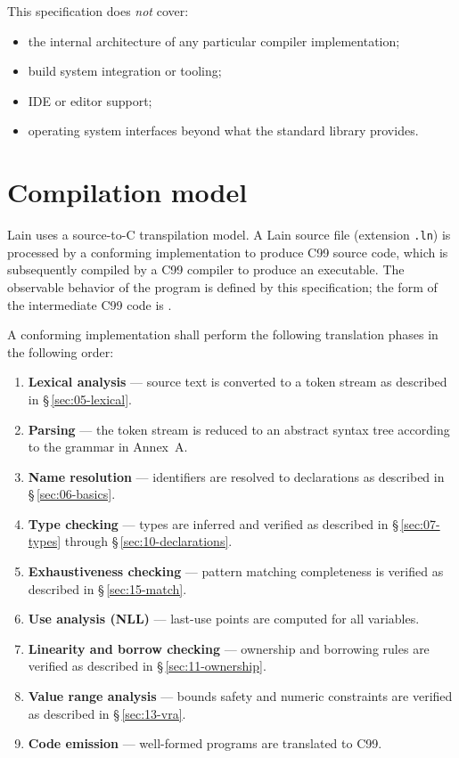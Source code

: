 \pnum
This specification does \emph{not} cover:

\begin{itemize}
  \item the internal architecture of any particular compiler implementation;
  \item build system integration or tooling;
  \item IDE or editor support;
  \item operating system interfaces beyond what the standard library provides.
\end{itemize}

\section{Compilation model}
\label{sec:scope.compilation}

\pnum
Lain uses a source-to-C transpilation model.  A Lain source file (extension
\texttt{.ln}) is processed by a conforming implementation to produce C99
source code, which is subsequently compiled by a C99 compiler to produce an
executable.  The observable behavior of the program is defined by this
specification; the form of the intermediate C99 code is
.

\pnum
A conforming implementation shall perform the following translation phases
in the following order:

\begin{enumerate}
  \item \textbf{Lexical analysis} --- source text is converted to a token
        stream as described in \S\,\ref{sec:05-lexical}.
  \item \textbf{Parsing} --- the token stream is reduced to an abstract
        syntax tree according to the grammar in Annex~A.
  \item \textbf{Name resolution} --- identifiers are resolved to
        declarations as described in \S\,\ref{sec:06-basics}.
  \item \textbf{Type checking} --- types are inferred and verified as
        described in \S\,\ref{sec:07-types} through
        \S\,\ref{sec:10-declarations}.
  \item \textbf{Exhaustiveness checking} --- pattern matching completeness
        is verified as described in \S\,\ref{sec:15-match}.
  \item \textbf{Use analysis (NLL)} --- last-use points are computed for
        all variables.
  \item \textbf{Linearity and borrow checking} --- ownership and borrowing
        rules are verified as described in \S\,\ref{sec:11-ownership}.
  \item \textbf{Value range analysis} --- bounds safety and numeric
        constraints are verified as described in \S\,\ref{sec:13-vra}.
  \item \textbf{Code emission} --- well-formed programs are translated to
        C99.
\end{enumerate}

